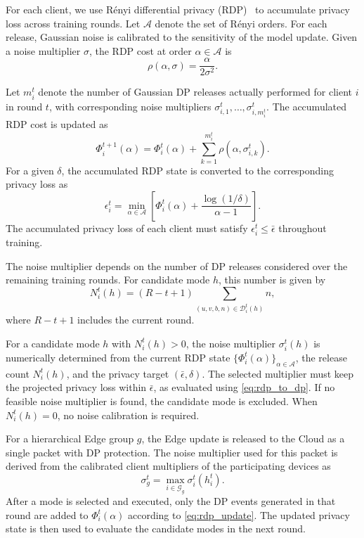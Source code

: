 \documentclass[5p,times]{elsarticle}
\theoremstyle{plain}
\theoremstyle{definition}
\theoremstyle{remark}
\begin{document}
For each client, we use R\'enyi differential
privacy (RDP)~\cite{mironov2017renyi} to
accumulate privacy loss across training rounds.
Let \(\mathcal A\) denote the set of R\'enyi
orders.
For each release, Gaussian noise is calibrated
to the sensitivity of the model update.
Given a noise multiplier \(\sigma\), the
RDP cost at order \(\alpha\in\mathcal A\) is
\begin{equation}
\rho(\alpha,\sigma)
=
\frac{\alpha}{2\sigma^2}.
\label{eq:rdp_event_cost}
\end{equation}

Let \(m_i^t\) denote the number of Gaussian DP
releases actually performed for client \(i\)
in round \(t\), with corresponding noise
multipliers
\(\sigma_{i,1}^t,\ldots,\sigma_{i,m_i^t}^t\).
The accumulated RDP cost is updated as
\begin{equation}
\Phi_i^{t+1}(\alpha)
=
\Phi_i^t(\alpha)
+
\sum_{k=1}^{m_i^t}
\rho(\alpha,\sigma_{i,k}^t).
\label{eq:rdp_update}
\end{equation}
For a given \(\delta\), the accumulated RDP state is converted to the
corresponding privacy loss as
\begin{equation}
\epsilon_i^t
=
\min_{\alpha\in\mathcal A}
\left[
\Phi_i^t(\alpha)
+
\frac{\log(1/\delta)}{\alpha-1}
\right].
\label{eq:rdp_to_dp}
\end{equation}
The accumulated privacy loss of each client
must satisfy \(\epsilon_i^t\le\bar{\epsilon}\)
throughout training.

The noise multiplier depends on the number
of DP releases considered over the remaining
training rounds. For candidate mode \(h\),
this number is given by
\begin{equation}
N_i^t(h)
=
(R-t+1)
\sum_{(u,v,b,n)\in\mathcal D_i^t(h)}n,
\label{eq:planned_update_events}
\end{equation}
where \(R-t+1\) includes the current round.

For a candidate mode \(h\) with \(N_i^t(h)>0\),
the noise multiplier \(\sigma_i^t(h)\) is
numerically determined from the current RDP
state \(\{\Phi_i^t(\alpha)\}_{\alpha\in\mathcal A}\),
the release count \(N_i^t(h)\), and the
privacy target \((\bar{\epsilon},\delta)\).
The selected multiplier must keep the
projected privacy loss within
\(\bar{\epsilon}\), as evaluated using
\eqref{eq:rdp_to_dp}.
If no feasible noise multiplier is found,
the candidate mode is excluded.
When \(N_i^t(h)=0\), no noise calibration
is required.

For a hierarchical Edge group \(g\), the Edge update is released to the Cloud as a single packet with DP protection. The noise
multiplier used for this packet is derived from the calibrated client
multipliers of the participating devices as
\begin{equation}
\sigma_g^t
=
\max_{i\in\mathcal G_g}
\sigma_i^t(h_i^t).
\label{eq:edge_group_noise_multiplier}
\end{equation}
After a mode is selected and executed, only the DP events generated in
that round are added to \(\Phi_i^t(\alpha)\) according to
\eqref{eq:rdp_update}. The updated privacy state is then used to evaluate
the candidate modes in the next round.
\end{document}
